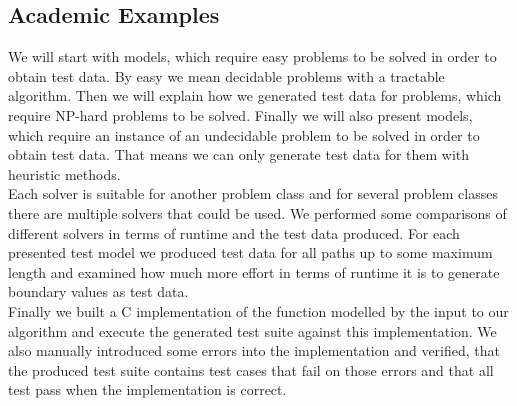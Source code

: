 \subsection{Academic Examples}
\label{sec:evaluationAcademicModels}
We will start with models, which require easy problems to be solved in order to obtain test data. By easy we mean decidable problems with a tractable algorithm. Then we will explain how we generated test data for problems, which require NP-hard problems to be solved. Finally we will also present models, which require an instance of an undecidable problem to be solved in order to obtain test data. That means we can only generate test data for them with heuristic methods.\\
Each solver is suitable for another problem class and for several problem classes there are multiple solvers that could be used. We performed some comparisons of different solvers in terms of runtime and the test data produced. For each presented test model we produced test data for all paths up to some maximum length and examined how much more effort in terms of runtime it is to generate boundary values as test data.\\
Finally we built a C implementation of the function modelled by the input to our algorithm and execute the generated test suite against this implementation. We also manually introduced some errors into the implementation and verified, that the produced test suite contains test cases that fail on those errors and that all test pass when the implementation is correct.
